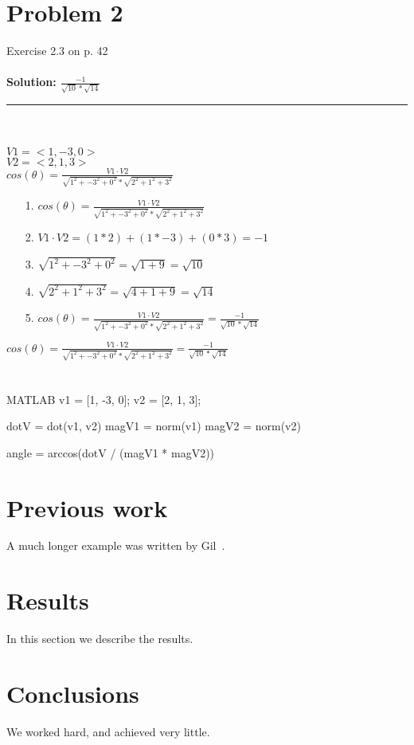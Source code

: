 \documentclass[12pt]{article}
\begin{document}
\section{Problem 2}	
Exercise 2.3 on p. 42\\ \\
\textbf{Solution: {\LARGE $ \frac{-1}{\sqrt{10} * \sqrt{14}}$ }}\\

\noindent\rule{22cm}{0.4pt}
\\ \\
$V1 = <1, -3, 0> $\\
$V2 = <2, 1, 3> $\\

{\Large$cos(\theta) = \frac{ V1 \cdot V2}{\sqrt{1^2 + -3^2 + 0^2} * \sqrt{2^2 + 1^2 + 3^2}}$ }\\

\begin{enumerate}
\item[1. ] $cos(\theta) = \frac{ V1 \cdot V2}{\sqrt{1^2 + -3^2 + 0^2} * \sqrt{2^2 + 1^2 + 3^2}}$ 
\item[2. ] $V1 \cdot V2 = (1 * 2) + (1 * -3) + (0 * 3) = -1 $
\item[3. ] $\sqrt{1^2 + -3^2 + 0^2} = \sqrt{1 + 9} = \sqrt{10} $
\item[4. ] $ \sqrt{2^2 + 1^2 + 3^2} = \sqrt{4 + 1 + 9} = \sqrt{14}$
\item[5. ] $cos(\theta) = \frac{ V1 \cdot V2}{\sqrt{1^2 + -3^2 + 0^2} * \sqrt{2^2 + 1^2 + 3^2}} = \frac{-1}{\sqrt{10} * \sqrt{14}}$  
\end{enumerate}

{\LARGE $cos(\theta) = \frac{ V1 \cdot V2}{\sqrt{1^2 + -3^2 + 0^2} * \sqrt{2^2 + 1^2 + 3^2}} = \frac{-1}{\sqrt{10} * \sqrt{14}}$ }\\
\\ \\

MATLAB
v1 = [1, -3, 0];
v2 = [2, 1, 3];

dotV = dot(v1, v2)
magV1 = norm(v1)
magV2 = norm(v2)

angle = arccos(dotV / (magV1 * magV2)) 

\section{Previous work}\label{previous work}
A much longer \LaTeXe{} example was written by Gil~\cite{Gil:02}.

\section{Results}\label{results}
In this section we describe the results.

\section{Conclusions}\label{conclusions}
We worked hard, and achieved very little.



\end{document}
